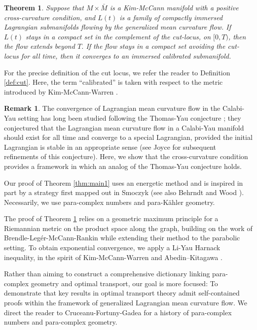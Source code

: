 \documentclass[12pt,letterpaper]{amsart}%
\newcounter{mycounter}
\numberwithin{mycounter}{section}
\newtheorem{theorem}[mycounter]{Theorem}
\theoremstyle{plain}
\numberwithin{equation}{section}
\theoremstyle{definition}
\newtheorem{remark}[mycounter]{Remark}
\begin{document}
\begin{theorem}
\label{thm:main2}Suppose that $M \times \bar{M}$ is a Kim-McCann manifold with a positive cross-curvature condition, and $L(t)$ is a family of compactly immersed Lagrangian submanifolds flowing by the generalized mean curvature flow.  If $L(t)$ stays in a compact set in the complement of the cut-locus, on $[0,T)$, then the flow extends beyond $T$. If the flow stays in a compact set avoiding the cut-locus for all time, then it converges to an immersed calibrated submanifold.  
\end{theorem}

For the precise definition of the cut locus, we refer the reader to Definition \ref{def:cut}. Here, the term “calibrated” is taken with respect to the metric introduced by Kim-McCann-Warren \cite{KMW}.

\begin{remark}
  The convergence of Lagrangian mean curvature flow in the Calabi-Yau setting has long been studied following the Thomas-Yau conjecture \cite{thomas2001special}; they conjectured that the Lagrangian mean curvature flow in a Calabi-Yau manifold should exist for all time and converge to a special Lagrangian, provided the initial Lagrangian is stable in an appropriate sense (see Joyce \cite{joyce2015conjectures} for subsequent refinements of this conjecture).  Here, we show that the cross-curvature condition provides a framework in which an analog of the Thomas-Yau conjecture holds.
\end{remark}







Our proof of Theorem \ref{thm:main1} uses an energetic method and is inspired in part by a strategy first mapped out in Smoczyk \cite{S96} (see also Behrndt \cite{B} and Wood \cite{Wood}). Necessarily, we use para-complex numbers and para-K\"ahler geometry.  

The proof of Theorem \ref{thm:main2} relies on a geometric maximum principle for a Riemannian metric on the product space along the graph, building on the work of Brendle-Leg\'er-McCann-Rankin \cite{BLMR} while extending their method to the parabolic setting. To obtain exponential convergence, we apply a Li-Yau Harnack inequality, in the spirit of Kim-McCann-Warren \cite{KMW} and Abedin–Kitagawa \cite{AK}.




Rather than aiming to construct a comprehensive dictionary linking para-complex geometry and optimal transport, our goal is more focused: To demonstrate that key results in optimal transport theory admit self-contained proofs within the framework of generalized Lagrangian mean curvature flow.  We direct the reader to Cruceanu-Fortuny-Gadea \cite{Para} for a history of para-complex numbers and para-complex geometry.  
\end{document}
